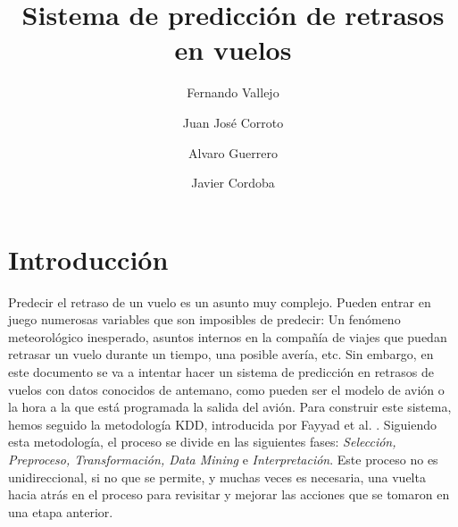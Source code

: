 \documentclass[format=acmsmall, review=false, screen=true]{acmart}
\begin{document}
	\title{Sistema de predicción de retrasos en vuelos}
	
	\author{Fernando Vallejo}
	\author{Juan José Corroto}
	\author{Alvaro Guerrero}
	\author{Javier Cordoba}
	
\maketitle

\begin{abstract}
	\lipsum[1]
\end{abstract}


\section{Introducción}
Predecir el retraso de un vuelo es un asunto muy complejo. Pueden entrar en juego numerosas variables que son imposibles de predecir: Un fenómeno meteorológico inesperado, asuntos internos en la compañía de viajes que puedan retrasar un vuelo durante un tiempo, una posible avería, etc. Sin embargo, en este documento se va a intentar hacer un sistema de predicción en retrasos de vuelos con datos conocidos de antemano, como pueden ser el modelo de avión o la hora a la que está programada la salida del avión. Para construir este sistema, hemos seguido la metodología KDD, introducida por Fayyad et al. \cite{Fayyad:1996:KPE:240455.240464}. Siguiendo esta metodología, el proceso se divide en las siguientes fases: \textit{Selección, Preproceso, Transformación, Data Mining} e \textit{Interpretación}. Este proceso no es unidireccional, si no que se permite, y muchas veces es necesaria, una vuelta hacia atrás en el proceso para revisitar y mejorar las acciones que se tomaron en una etapa anterior.
\end{document}
